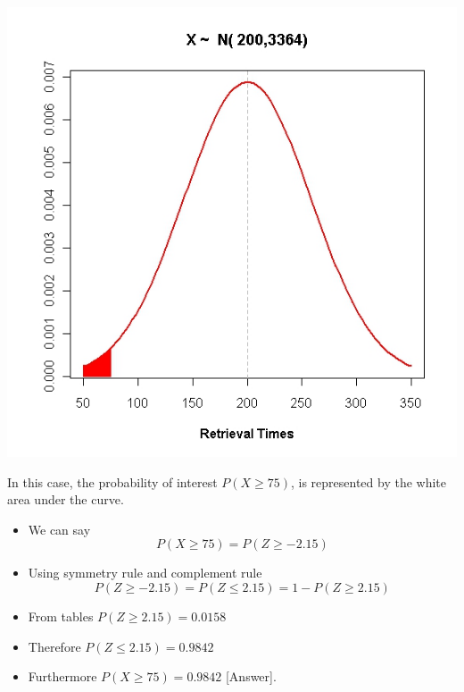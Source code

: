 ﻿\documentclass[]{report}
\begin{document}
	\begin{center}
		\includegraphics[scale=0.40]{images/5BNormal2}
	\end{center}
	
	In this case, the probability of interest $P(X\geq 75)$, is represented by the white area under the curve.
	
	
	\begin{itemize}
		\item We can say
		\[ P( X \geq 75) = P( Z \geq -2.15)\]
		\item Using symmetry rule and complement rule
		\[ P( Z \geq -2.15) = P( Z \leq 2.15) = 1- P( Z \geq 2.15)\]
		\item From tables $P( Z \geq 2.15) = 0.0158$
		\item Therefore $P( Z \leq 2.15) = 0.9842$
		\item Furthermore $P( X \geq 75) = \boldsymbol{0.9842}$ [Answer].
	\end{itemize}
		
\end{document}
